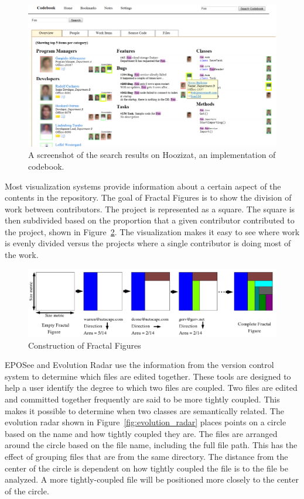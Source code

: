 \begin{figure}[htpb]
  \centering
  \includegraphics[width=0.8\linewidth]{Figures/introduction/codebook.png}
  \caption{A screenshot of the search results on Hoozizat, an
    implementation of codebook.\cite{Begel2010}}
  \label{fig:codebook}
\end{figure}

Most visualization systems provide information about a certain aspect of
the contents in the repository.
The goal of Fractal Figures\cite{Ambros2005} is to show the division of
work between contributors.
The project is represented as a square.
The square is then subdivided based on the proportion that a given
contributor contributed
to the project, shown in Figure~\ref{fig:fractal_figures}.
The visualization makes it easy to see where work is evenly divided versus
the projects where a single contributor is doing most of the work.

\begin{figure}[htpb]
  \centering
  \includegraphics[width=0.8\linewidth]{Figures/introduction/fractal_figures.png}
  \caption{Construction of Fractal Figures\cite{Ambros2005}}
  \label{fig:fractal_figures}
\end{figure}

EPOSee\cite{Burch2005} and Evolution Radar\cite{Ambros2009} use the
information from the version control system to determine which files
are edited together.
These tools  are designed to help a user identify the degree to which
two files are coupled.
Two files are edited and committed together frequently are said to be
more tightly coupled.
This makes it possible to determine when two classes are semantically
related.
The evolution radar shown in Figure~\ref{fig:evolution_radar} places
points on a circle based on the name and how tightly coupled they are.
The files are arranged around the circle
based on the file name, including the full file path. This has the
effect of grouping files that are from the same directory. The distance
from the center of the circle is dependent on how tightly coupled the
file is to the file be analyzed. A more tightly-coupled file will be
positioned more closely to the center of the circle.


